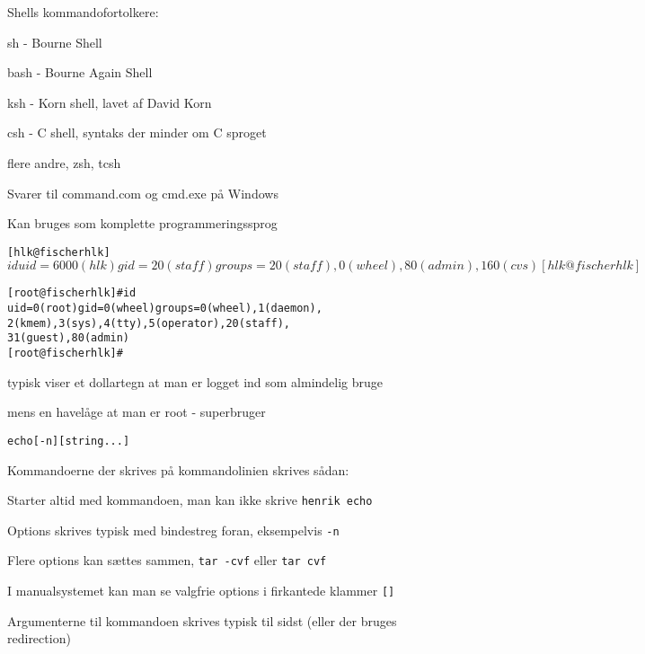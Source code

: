 
\begin{list1}
\item Shells kommandofortolkere:
  \begin{list2}
    \item sh - Bourne Shell
\item bash - Bourne Again Shell
\item ksh - Korn shell, lavet af David Korn
\item csh - C shell, syntaks der minder om C sproget
\item flere andre, zsh, tcsh 
  \end{list2}
\item Svarer til command.com og cmd.exe på Windows
\item Kan bruges som komplette programmeringssprog
\end{list1}



\begin{alltt}    
\small
[hlk@fischer hlk]$ id
uid=6000(hlk) gid=20(staff) groups=20(staff), 
0(wheel), 80(admin), 160(cvs) 
[hlk@fischer hlk]$ 

[root@fischer hlk]# id
uid=0(root) gid=0(wheel) groups=0(wheel), 1(daemon),
2(kmem), 3(sys), 4(tty), 5(operator), 20(staff), 
31(guest), 80(admin) 
[root@fischer hlk]#
\end{alltt}

\begin{list1}  
\item typisk viser et dollartegn at man er logget ind som almindelig bruge
\item mens en havelåge at man er root - superbruger
\end{list1}



\begin{alltt}
echo [-n] [string ...]  
\end{alltt}

\begin{list1}
\item Kommandoerne der skrives på kommandolinien skrives sådan:
\begin{list2}
\item Starter altid med kommandoen, man kan ikke skrive \verb+henrik echo+
\item Options skrives typisk med bindestreg foran, eksempelvis \verb+-n+
\item Flere options kan sættes sammen, \verb+tar -cvf+ eller \verb+tar cvf+
\item I manualsystemet kan man se valgfrie options i firkantede
  klammer \verb+[]+
\item Argumenterne til kommandoen skrives typisk til sidst (eller der
  bruges redirection)
\end{list2}
\end{list1}


